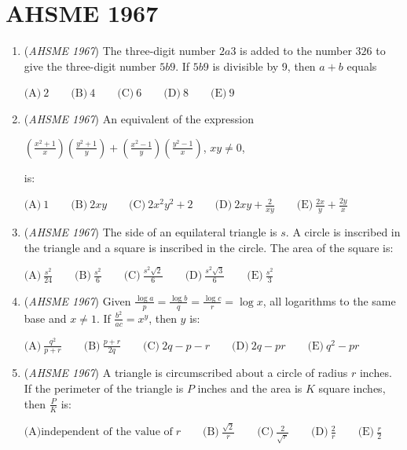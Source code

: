 \section{AHSME 1967}
        \begin{enumerate}
        	\item (\textit{AHSME 1967}) The three-digit number $2a3$ is added to the number $326$ to give the three-digit number $5b9$.  If $5b9$ is divisible by 9, then $a+b$ equals


 $\text{(A)}\ 2\qquad\text{(B)}\ 4\qquad\text{(C)}\ 6\qquad\text{(D)}\ 8\qquad\text{(E)}\ 9$


	\item (\textit{AHSME 1967}) An equivalent of the expression


 $\left(\frac{x^2+1}{x}\right)\left(\frac{y^2+1}{y}\right)+\left(\frac{x^2-1}{y}\right)\left(\frac{y^2-1}{x}\right)$, $xy \not= 0$,


 is:


 $\text{(A)}\ 1\qquad\text{(B)}\ 2xy\qquad\text{(C)}\ 2x^2y^2+2\qquad\text{(D)}\ 2xy+\frac{2}{xy}\qquad\text{(E)}\ \frac{2x}{y}+\frac{2y}{x}$


	\item (\textit{AHSME 1967}) The side of an equilateral triangle is $s$.  A circle is inscribed in the triangle and a square is inscribed in the circle.  The area of the square is:


 $\text{(A)}\ \frac{s^2}{24}\qquad\text{(B)}\ \frac{s^2}{6}\qquad\text{(C)}\ \frac{s^2\sqrt{2}}{6}\qquad\text{(D)}\ \frac{s^2\sqrt{3}}{6}\qquad\text{(E)}\ \frac{s^2}{3}$


	\item (\textit{AHSME 1967}) Given $\frac{\log{a}}{p}=\frac{\log{b}}{q}=\frac{\log{c}}{r}=\log{x}$, all logarithms to the same base and $x \not= 1$.  If $\frac{b^2}{ac}=x^y$, then $y$ is:


 $\text{(A)}\ \frac{q^2}{p+r}\qquad\text{(B)}\ \frac{p+r}{2q}\qquad\text{(C)}\ 2q-p-r\qquad\text{(D)}\ 2q-pr\qquad\text{(E)}\ q^2-pr$


	\item (\textit{AHSME 1967}) A triangle is circumscribed about a circle of radius $r$ inches.  If the perimeter of the triangle is $P$ inches and the area is $K$ square inches, then $\frac{P}{K}$ is:


 $\text{(A)}\text{independent of the value of} \; r\qquad\text{(B)}\ \frac{\sqrt{2}}{r}\qquad\text{(C)}\ \frac{2}{\sqrt{r}}\qquad\text{(D)}\ \frac{2}{r}\qquad\text{(E)}\ \frac{r}{2}$



\end{enumerate}
